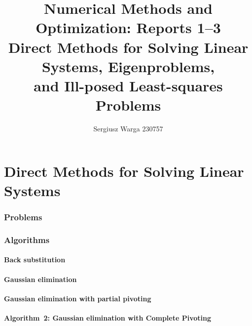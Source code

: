 \documentclass[a4paper]{article}
\title{%
  {\LARGE Numerical Methods and Optimization: Reports 1--3}\\[0.4em]
  {\large Direct Methods for Solving Linear Systems,
    Eigenproblems,\\
    and Ill-posed Least-squares Problems}%
}
\author{Sergiusz Warga 230757}
\date{}
\newcommand{\labbase}{}
\let\OrigLstInputListing
\renewcommand{}[2][]{\OrigLstInputListing[#1]{\labbase#2}}
\begin{document}
\maketitle
\tableofcontents
\pagebreak

\part{Direct Methods for Solving Linear Systems}

\renewcommand{\labbase}{lab1/}

\section{Problems}









\clearpage

\section{Algorithms}
\subsection{Back substitution}%
\label{algorithm:back_substitution}

\subsection{Gaussian elimination}%
\label{algorithm:gaussian_elimination}

\subsection{Gaussian elimination with partial pivoting}
\label{algorithm:gaussian_elimination_with_partial_pivoting}
\subsection{Algorithm~2: Gaussian elimination with Complete Pivoting}%
\label{algorithm:2}

\end{document}
